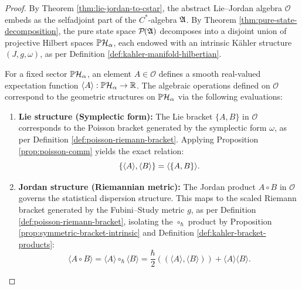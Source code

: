 \begin{proof}
	By Theorem \ref{thm:lie-jordan-to-cstar}, the abstract Lie--Jordan algebra $\mathcal{O}$ embeds  as the selfadjoint part of the $C^*$-algebra $\mathfrak{A}$. By Theorem \ref{thm:pure-state-decomposition}, the pure state space $\mathcal{P}(\A)$ decomposes into a disjoint union of projective Hilbert spaces $\PH_\alpha$, each endowed with an intrinsic Kähler structure $(J, g, \omega)$, as per Definition \ref{def:kahler-manifold-hilbertian}. 
	
	For a fixed sector $\PH_\alpha$, an element $A \in \mathcal{O}$ defines a smooth real-valued expectation function $\langle A \rangle : \PH_\alpha \to \R$. The algebraic operations defined on $\mathcal{O}$ correspond to the geometric structures on $\PH_\alpha$ via the following evaluations:
	
	\begin{enumerate}
		\item \textbf{Lie structure (Symplectic form):}
		The Lie bracket $\{A,B\}$ in $\mathcal{O}$ corresponds to the Poisson bracket generated by the symplectic form $\omega$, as per Definition \ref{def:poisson-riemann-bracket}. Applying Proposition \ref{prop:poisson-comm} yields the exact relation:
		\begin{equation}
			\{\langle A\rangle,\langle B\rangle\} = \langle \{A,B\} \rangle.
		\end{equation} 
		
		\item \textbf{Jordan structure (Riemannian metric):}
		The Jordan product $A \circ B$ in $\mathcal{O}$ governs the statistical dispersion structure. This maps to the scaled Riemann bracket generated by the Fubini--Study metric $g$, as per Definition \ref{def:poisson-riemann-bracket}, isolating the $\circ_{\hbar}$ product by Proposition \ref{prop:symmetric-bracket-intrinsic} and Definition \ref{def:kahler-bracket-products}:
		\begin{equation}
			\langle A \circ B \rangle = \langle A \rangle \circ_{\hbar} \langle B \rangle = \frac{\hbar}{2}((\langle A \rangle, \langle B \rangle)) + \langle A \rangle \langle B \rangle.
		\end{equation} 
		

\end{enumerate}
\end{proof}
